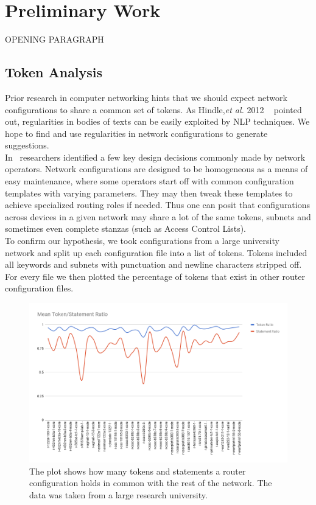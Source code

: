 \section{Preliminary Work}
OPENING PARAGRAPH

\subsection{Token Analysis}
Prior research in computer networking hints that we should expect network configurations to share a common set of tokens. As Hindle,\textit{et al.} 2012 ~\cite{naturalness} pointed out, regularities in bodies of texts can be easily exploited by NLP techniques. We hope to find and use regularities in network configurations to generate suggestions.\\

In~\cite{complexity} researchers identified a few key design decisions commonly made by network operators. Network configurations are designed to be homogeneous as a means of easy maintenance, where some operators start off with common configuration templates with varying parameters. They may then tweak these templates to achieve specialized routing roles if needed. Thus one can posit that configurations across devices in a given network may share a lot of the same tokens, subnets and sometimes even complete stanzas (such as Access Control Lists).\\ 

To confirm our hypothesis, we took configurations from a large university network and split up each configuration file into a list of tokens. Tokens included all keywords and subnets with punctuation and newline characters stripped off. For every file we then plotted the percentage of tokens that exist in other router configuration files.

\begin{figure}[H]
	\centering
	\includegraphics[width=\textwidth]{chart.png}
	\caption{The plot shows how many tokens and statements a router configuration holds in common with the rest of the network. The data was taken from a large research university.}
\end{figure}

